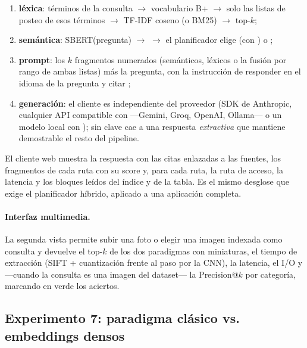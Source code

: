 \begin{enumerate}[nosep]
  \item \textbf{léxica}: términos de la consulta $\to$ vocabulario B+ $\to$ solo las
        listas de posteo de esos términos $\to$ TF-IDF coseno (o BM25) $\to$ top-$k$;
  \item \textbf{semántica}: SBERT(pregunta) $\to$  $\to$ el planificador elige  (con
        ) o ;
  \item \textbf{prompt}: los $k$ fragmentos numerados (semánticos, léxicos o la fusión
        por rango de ambas listas) más la pregunta, con la instrucción de responder en
        el idioma de la pregunta y citar \code{[n]};
  \item \textbf{generación}: el cliente  es independiente del
        proveedor (SDK de Anthropic, cualquier API compatible con
         ---Gemini, Groq, OpenAI, Ollama--- o un modelo local
        con ); sin clave cae a una respuesta \emph{extractiva} que
        mantiene demostrable el resto del pipeline.
\end{enumerate}

El cliente web muestra la respuesta con las citas enlazadas a las fuentes, los
fragmentos de cada ruta con su score y, para cada ruta, la ruta de acceso, la latencia
y los bloques leídos del índice y de la tabla. Es el mismo desglose que exige el
planificador híbrido, aplicado a una aplicación completa.

\paragraph{Interfaz multimedia.} La segunda vista permite subir una foto o elegir una
imagen indexada como consulta y devuelve el top-$k$ de los dos paradigmas con
miniaturas, el tiempo de extracción (SIFT + cuantización frente al paso por la CNN),
la latencia, el I/O y ---cuando la consulta es una imagen del dataset--- la
Precision@$k$ por categoría, marcando en verde los aciertos.

\subsection{Experimento 7: paradigma clásico vs. embeddings densos}

